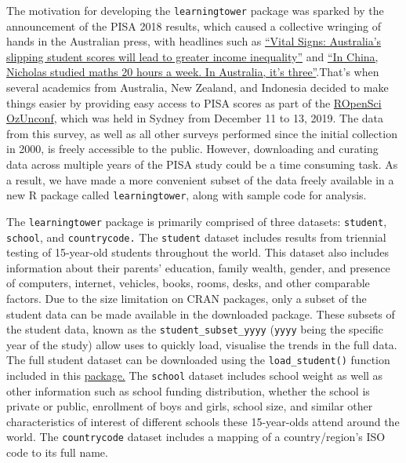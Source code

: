 The motivation for developing the \texttt{learningtower} package was
sparked by the announcement of the PISA 2018 results, which caused a
collective wringing of hands in the Australian press, with headlines
such as
\href{https://theconversation.com/vital-signs-australias-slipping-student-scores-will-lead-to-greater-income-inequality-128301}{``Vital
Signs: Australia's slipping student scores will lead to greater income
inequality''} and
\href{https://www.smh.com.au/education/in-china-nicholas-studied-maths-20-hours-a-week-in-australia-it-s-three-20191203-p53ggv.html}{``In
China, Nicholas studied maths 20 hours a week. In Australia, it's
three''}.That's when several academics from Australia, New Zealand, and
Indonesia decided to make things easier by providing easy access to PISA
scores as part of the \href{https://ozunconf19.ropensci.org/}{ROpenSci
OzUnconf}, which was held in Sydney from December 11 to 13, 2019. The
data from this survey, as well as all other surveys performed since the
initial collection in 2000, is freely accessible to the public. However,
downloading and curating data across multiple years of the PISA study
could be a time consuming task. As a result, we have made a more
convenient subset of the data freely available in a new R package called
\texttt{learningtower}, along with sample code for analysis.

The \texttt{learningtower} package is primarily comprised of three
datasets: \texttt{student}, \texttt{school}, and \texttt{countrycode.}
The \texttt{student} dataset includes results from triennial testing of
15-year-old students throughout the world. This dataset also includes
information about their parents' education, family wealth, gender, and
presence of computers, internet, vehicles, books, rooms, desks, and
other comparable factors. Due to the size limitation on CRAN packages,
only a subset of the student data can be made available in the
downloaded package. These subsets of the student data, known as the
\texttt{student\_subset\_yyyy} (\texttt{yyyy} being the specific year of
the study) allow uses to quickly load, visualise the trends in the full
data. The full student dataset can be downloaded using the
\texttt{load\_student()} function included in this
\href{https://kevinwang09.github.io/learningtower/}{package.} The
\texttt{school} dataset includes school weight as well as other
information such as school funding distribution, whether the school is
private or public, enrollment of boys and girls, school size, and
similar other characteristics of interest of different schools these
15-year-olds attend around the world. The \texttt{countrycode} dataset
includes a mapping of a country/region's ISO code to its full name.

